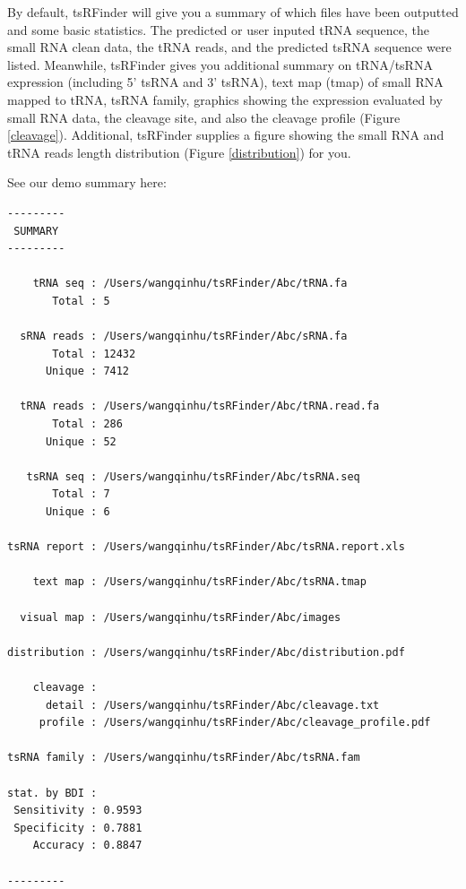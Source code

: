 \documentclass[11pt, a4paper]{article}
\begin{document}
By default, tsRFinder will give you a summary of which files have been outputted and some basic statistics. The predicted or user inputed tRNA sequence, the small RNA clean data, the tRNA reads, and the predicted tsRNA sequence were listed. Meanwhile, tsRFinder gives you additional summary on tRNA/tsRNA expression (including 5' tsRNA and 3' tsRNA), text map (tmap) of small RNA mapped to tRNA, tsRNA family, graphics showing the expression evaluated by small RNA data, the cleavage site, and also the cleavage profile (Figure \ref{cleavage}). Additional, tsRFinder supplies a figure showing the small RNA and tRNA reads length distribution (Figure \ref{distribution}) for you.

See our demo summary here:

{\small \begin{verbatim}
---------
 SUMMARY 
---------

    tRNA seq : /Users/wangqinhu/tsRFinder/Abc/tRNA.fa
       Total : 5

  sRNA reads : /Users/wangqinhu/tsRFinder/Abc/sRNA.fa
       Total : 12432
      Unique : 7412

  tRNA reads : /Users/wangqinhu/tsRFinder/Abc/tRNA.read.fa
       Total : 286
      Unique : 52

   tsRNA seq : /Users/wangqinhu/tsRFinder/Abc/tsRNA.seq
       Total : 7
      Unique : 6

tsRNA report : /Users/wangqinhu/tsRFinder/Abc/tsRNA.report.xls

    text map : /Users/wangqinhu/tsRFinder/Abc/tsRNA.tmap

  visual map : /Users/wangqinhu/tsRFinder/Abc/images

distribution : /Users/wangqinhu/tsRFinder/Abc/distribution.pdf

    cleavage :
      detail : /Users/wangqinhu/tsRFinder/Abc/cleavage.txt
     profile : /Users/wangqinhu/tsRFinder/Abc/cleavage_profile.pdf

tsRNA family : /Users/wangqinhu/tsRFinder/Abc/tsRNA.fam

stat. by BDI :
 Sensitivity : 0.9593
 Specificity : 0.7881
    Accuracy : 0.8847

---------
\end{verbatim}
}
\end{document}
